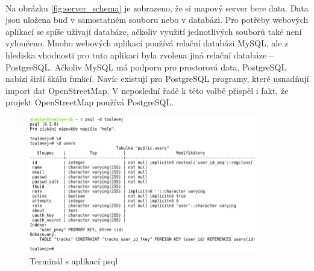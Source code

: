 \documentclass[11pt,a4paper,titlepage,oneside]{book}
\begin{document}
		\paragraph{} Na obrázku \ref{fig:server_schema} je zobrazeno, že si mapový server bere data. Data jsou uložena buď v samostatném souboru nebo v databázi. Pro potřeby webových aplikací se spíše užívají databáze, ačkoliv využití jednotlivých souborů také není vyloučeno. Mnoho webových aplikací používá relační databázi MySQL, ale z hlediska vhodnosti pro tuto aplikaci byla zvolena jiná relační databáze -- PostgreSQL. Ačkoliv MySQL má podporu pro prostorová data, PostgreSQL nabízí širší škálu funkcí. Navíc existují pro PostgreSQL programy, které usnadňují import dat OpenStreetMap. V neposlední řadě k této volbě přispěl i fakt, že projekt OpenStreetMap používá PostgreSQL.
		\begin{figure}[!h]
			\begin{center}
				\includegraphics[width=10cm]{obrazky/psql.png}
				\caption{Terminál s aplikací psql}
				\label{fig:psql}
			\end{center}
		\end{figure}



\end{document}
